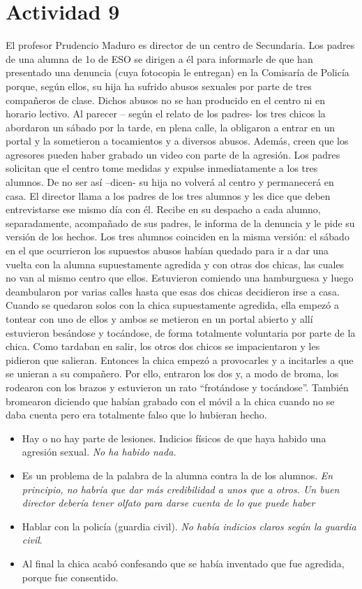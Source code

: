 \section{Actividad 9}

El profesor Prudencio Maduro es director de un centro de Secundaria.
%
Los padres de una alumna de 1o de ESO se dirigen a él para informarle de que han presentado una denuncia (cuya fotocopia le entregan) en la Comisaría de Policía porque, según ellos, su hija ha sufrido abusos sexuales por parte de tres compañeros de clase.
%
Dichos abusos no se han producido en el centro ni en horario lectivo.
%
Al parecer – según el relato de los padres- los tres chicos la abordaron un sábado por la tarde, en plena calle, la obligaron a entrar en un portal y la sometieron a tocamientos y a diversos abusos.
%
Además, creen que los agresores pueden haber grabado un video con parte de la agresión.
%
Los padres solicitan que el centro tome medidas y expulse inmediatamente a los tres alumnos.
%
De no ser así –dicen- su hija no volverá al centro y permanecerá en casa.
%
El director llama a los padres de los tres alumnos y les dice que deben entrevistarse ese mismo día con él.
%
Recibe en su despacho a cada alumno, separadamente, acompañado de sus padres, le informa de la denuncia y le pide su versión de los hechos.
%
Los tres alumnos coinciden en la misma versión: el sábado en el que ocurrieron los supuestos abusos habían quedado para ir a dar una vuelta con la alumna supuestamente agredida y con otras dos chicas, las cuales no van al mismo centro que ellos.
%
Estuvieron comiendo una hamburguesa y luego deambularon por varias calles hasta que esas dos chicas decidieron irse a casa.
%
Cuando se quedaron solos con la chica supuestamente agredida, ella empezó a tontear con uno de ellos y ambos se metieron en un portal abierto y allí estuvieron besándose y tocándose, de forma totalmente voluntaria por parte de la chica.
%
Como tardaban en salir, los otros dos chicos se impacientaron y les pidieron que salieran.
%
Entonces la chica empezó a provocarles y a incitarles a que se unieran a su compañero.
%
Por ello, entraron los dos y, a modo de broma, los rodearon con los brazos y estuvieron un rato “frotándose y tocándose”.
%
También bromearon diciendo que habían grabado con el móvil a la chica cuando no se daba cuenta pero era totalmente falso que lo hubieran hecho.

\begin{itemize}
	\item Hay o no hay parte de lesiones. Indicios físicos de que haya habido una agresión sexual.
	\subitem\textit{No ha habido nada.}
	\item Es un problema de la palabra de la alumna contra la de los alumnos.
	\subitem\textit{En principio, no habría que dar más credibilidad a unos que a otros. 
	Un buen director debería tener olfato para darse cuenta de lo que puede haber}
	\item Hablar con la policía (guardia civil). 
	\subitem\textit{No había indicios claros según la guardia civil}.
	\item Al final la chica acabó confesando que se había inventado que fue agredida, porque fue consentido.
\end{itemize}

